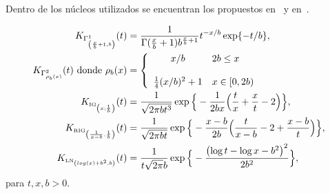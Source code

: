 Dentro de los núcleos utilizados se encuentran los propuestos en~\cite{bouezmarni2005} y en~\cite{Libnegue2013}. 


\begin{align}
K_{\tiny \Gamma^1_{\left(\frac{x}{b}+1,b\right)}}(t) & =\frac{1}{\Gamma(\frac{x}{b}+1)b^{\frac{x}{b}+1}} t^{-{x}/{b}} \exp\{-{t}/{b}\},
\label{gammakernel}\\
K_{\tiny \Gamma^2_{{\rho}_b(x)}}(t) \text{ donde }
\rho_b (x)&= \left\{
\begin{array}{c l}
x/b & 2 b \leq  x \\
\\
\frac{1}{4}(x/b)^2+1 & x \in [0,2 b)\\
\end{array}
\right.
\label{gammakernel2}\\
K_{\text{\tiny IG}_{\left( x;\frac{1}{b}\right)}}(t) & =\frac{1}{\sqrt{2\pi b t^3}} 
\exp\Big\{-\frac{1}{2b x} \Big(\frac{t}{x}+\frac{x}{t}-2\Big)\Big\},
\label{IGkernel}\\
K_{\text{\tiny RIG}_{\left(\frac{1}{x-b},\frac{1}{b}\right)}}(t) & =\frac{1}{\sqrt{2\pi b t}} 
\exp\Big\{-\frac{x-b}{2b} \Big(\frac{t}{x-b}-2+\frac{x-b}{t}\Big)\Big\},
\label{RIGkernel}\\
K_{{\text{\tiny LN}}_{\left(log(x)+b^2,b \right)}}(t) & =\frac{1}{t \sqrt{2 \pi} b} \exp\Big\{-\frac{\left(\log t - \log x -b^2\right)^2}{2b^2}\Big\},
\label{LNkernel}
\end{align}
para $t,x,b>0$.

